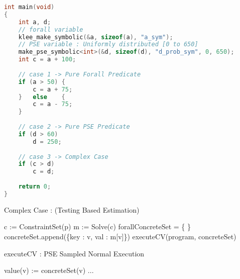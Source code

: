 \documentclass{article}
\begin{document}
\begin{lstlisting}[language=C++, caption={C++ code using listings}]
int main(void)
{
	int a, d;
	// forall variable
	klee_make_symbolic(&a, sizeof(a), "a_sym");
	// PSE variable : Uniformly distributed [0 to 650]
	make_pse_symbolic<int>(&d, sizeof(d), "d_prob_sym", 0, 650);
	int c = a + 100;
	
	// case 1 -> Pure Forall Predicate
	if (a > 50)	{
		c = a + 75;
	}	else	{
		c = a - 75;
	}
	
	// case 2 -> Pure PSE Predicate
	if (d > 60)
		d = 250;
	
	// case 3 -> Complex Case
	if (c > d)
		c = d;
	
	return 0;
}
\end{lstlisting}

\begin{algorithm}[H]
    \caption{Complex Case : (Testing Based Estimation)}
    \begin{algorithmic}[1]
        \State c := ConstraintSet(p) 
        \State m := Solve(c) 
        \State forallConcreteSet = \{ \}
        	\State concreteSet.append(\{key : v, val : m[v]\}) 
        	\EndForEach
        \State executeCV(program, concreteSet)
        \EndForEach
    \end{algorithmic}
\end{algorithm}

\begin{algorithm}[H]
	\caption{executeCV : PSE Sampled Normal Execution}
	\begin{algorithmic}[1]
			\State value(v) := concreteSet(v) 
			\EndForEach
			\State ... 
		\EndFunction
	\end{algorithmic}
\end{algorithm}
\end{document}
